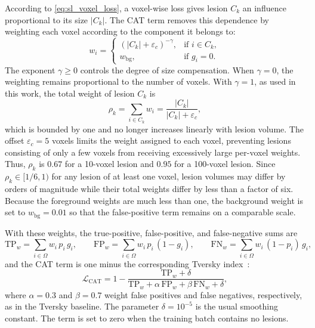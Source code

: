 According to \cref{eq:sl_voxel_loss}, a voxel-wise loss gives lesion $C_k$
an influence proportional to its size $|C_k|$. The CAT term removes this
dependence by weighting each voxel according to the component it belongs
to:
\begin{equation}
w_i =
\begin{cases}
(|C_k| + \varepsilon_{c})^{-\gamma}, & \text{if } i \in C_k, \\
w_{\mathrm{bg}}, & \text{if } g_i = 0 .
\end{cases}
\label{eq:sl_cat_weights}
\end{equation}
The exponent $\gamma \geq 0$ controls the degree of size compensation.
When $\gamma=0$, the weighting remains proportional to the number of
voxels. With $\gamma=1$, as used in this work, the total weight of lesion
$C_k$ is
\begin{equation}
\rho_k
=
\sum_{i \in C_k} w_i
=
\frac{|C_k|}{|C_k| + \varepsilon_{c}} ,
\label{eq:sl_cat_lesion_weight}
\end{equation}
which is bounded by one and no longer increases linearly with lesion
volume. The offset $\varepsilon_{c}=5$ voxels limits the weight assigned to
each voxel, preventing lesions consisting of only a few voxels from
receiving excessively large per-voxel weights. Thus, $\rho_k$ is $0.67$ for
a 10-voxel lesion and $0.95$ for a 100-voxel lesion. Since
$\rho_k \in [1/6, 1)$ for any lesion of at least one voxel, lesion volumes
may differ by orders of magnitude while their total weights differ by less
than a factor of six. Because the foreground weights are much less than
one, the background weight is set to $w_{\mathrm{bg}}=0.01$ so that the
false-positive term remains on a comparable scale.

With these weights, the true-positive, false-positive, and false-negative
sums are
\begin{equation}
\mathrm{TP}_{w} = \sum_{i \in \Omega} w_i\, p_i\, g_i,
\qquad
\mathrm{FP}_{w} = \sum_{i \in \Omega} w_i\, p_i\, (1-g_i),
\qquad
\mathrm{FN}_{w} = \sum_{i \in \Omega} w_i\, (1-p_i)\, g_i ,
\end{equation}
and the CAT term is one minus the corresponding Tversky
index~\cite{salehi_tversky_2017}:
\begin{equation}
\mathcal{L}_{\mathrm{CAT}}
=
1 -
\frac{\mathrm{TP}_{w}+\delta}
{\mathrm{TP}_{w} + \alpha\, \mathrm{FP}_{w} + \beta\, \mathrm{FN}_{w} + \delta},
\label{eq:sl_cat_loss}
\end{equation}
where $\alpha=0.3$ and $\beta=0.7$ weight false positives and false
negatives, respectively, as in the Tversky baseline. The parameter
$\delta=10^{-5}$ is the usual smoothing constant. The term is set to zero
when the training batch contains no lesions.

